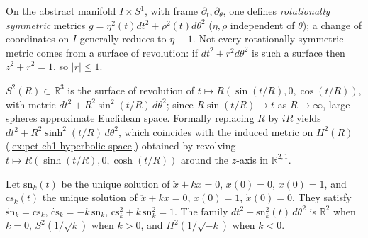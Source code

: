 \begin{remark}
  \label{rem:pet-ch1-rotationally-symmetric}
  \leanok
  On the abstract manifold $I\times S^1$, with frame $\partial_t,\partial_\theta$,
  one defines \emph{rotationally symmetric} metrics $g=\eta^2(t)dt^2+\rho^2(t)d\theta^2$
  ($\eta,\rho$ independent of $\theta$); a change of coordinates on $I$ generally
  reduces to $\eta\equiv1$. Not every rotationally symmetric metric comes from a
  surface of revolution: if $dt^2+r^2d\theta^2$ is such a surface then
  $\dot z^2+\dot r^2=1$, so $|\dot r|\le1$.
\end{remark}

\begin{example}
  \label{ex:pet-ch1-sphere-revolution}
  \leanok
  $S^2(R)\subset\mathbb{R}^3$ is the surface of revolution of
  $t\mapsto R(\sin(t/R),0,\cos(t/R))$, with metric
  $dt^2+R^2\sin^2(t/R)\,d\theta^2$; since $R\sin(t/R)\to t$ as $R\to\infty$,
  large spheres approximate Euclidean space. Formally replacing $R$ by $iR$
  yields $dt^2+R^2\sinh^2(t/R)\,d\theta^2$, which coincides with the induced
  metric on $H^2(R)$ (\cref{ex:pet-ch1-hyperbolic-space}) obtained by revolving
  $t\mapsto R(\sinh(t/R),0,\cosh(t/R))$ around the $z$-axis in $\mathbb{R}^{2,1}$.
\end{example}

\begin{definition}
  \label{def:pet-ch1-snk-csk}
  \leanok
  Let $\mathrm{sn}_k(t)$ be the unique solution of $\ddot x+kx=0$, $x(0)=0$,
  $\dot x(0)=1$, and $\mathrm{cs}_k(t)$ the unique solution of $\ddot x+kx=0$,
  $x(0)=1$, $\dot x(0)=0$. They satisfy
  $\dot{\mathrm{sn}}_k=\mathrm{cs}_k$, $\dot{\mathrm{cs}}_k=-k\,\mathrm{sn}_k$,
  $\mathrm{cs}_k^2+k\,\mathrm{sn}_k^2=1$. The family
  $dt^2+\mathrm{sn}_k^2(t)\,d\theta^2$ is $\mathbb{R}^2$ when $k=0$, $S^2(1/\sqrt k)$ when
  $k>0$, and $H^2(1/\sqrt{-k})$ when $k<0$.
\end{definition}

